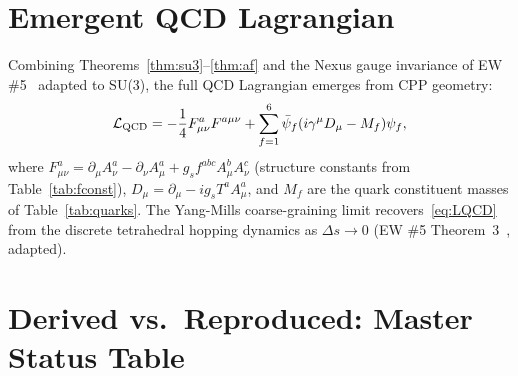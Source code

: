 \documentclass[11pt,a4paper]{article}
\begin{document}
\section{Emergent QCD Lagrangian}
\label{sec:lagrangian}

Combining Theorems~\ref{thm:su3}--\ref{thm:af} and the
Nexus gauge invariance of EW \#5~\citep{cpp_ew5} adapted to SU(3),
the full QCD Lagrangian emerges from CPP geometry:
\begin{equation}
\mathcal{L}_{\rm QCD}
= -\frac{1}{4}F^a_{\mu\nu}F^{a\mu\nu}
+ \sum_{f=1}^{6}\bar{\psi}_f(i\gamma^\mu D_\mu - M_f)\psi_f,
\label{eq:LQCD}
\end{equation}
where $F^a_{\mu\nu} = \partial_\mu A^a_\nu - \partial_\nu A^a_\mu
+ g_s f^{abc}A^b_\mu A^c_\nu$ (structure constants from
Table~\ref{tab:fconst}), $D_\mu = \partial_\mu - ig_s T^a A^a_\mu$,
and $M_f$ are the quark constituent masses of Table~\ref{tab:quarks}.
The Yang-Mills coarse-graining limit recovers~\eqref{eq:LQCD} from
the discrete tetrahedral hopping dynamics as $\Delta s \to 0$
(EW \#5 Theorem~3~\citep{cpp_ew5}, adapted).

\section{Derived vs.\ Reproduced: Master Status Table}
\label{sec:status}
\end{document}
